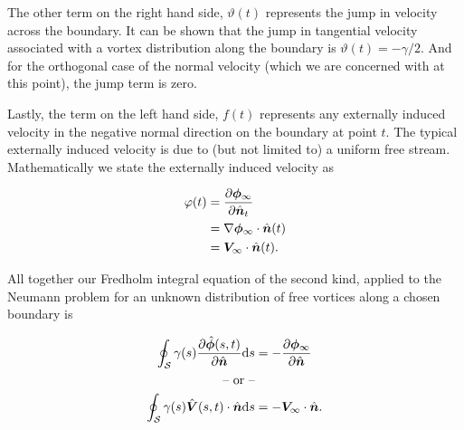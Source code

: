 The other term on the right hand side, \(\vartheta(t)\) represents the jump in velocity across the boundary.
%
It can be shown that the jump in tangential velocity associated with a vortex distribution along the boundary is \(\vartheta(t) = -\gamma/2\).
%
And for the orthogonal case of the normal velocity (which we are concerned with at this point), the jump term is zero.%
%

Lastly, the term on the left hand side, \(f(t)\) represents any externally induced velocity in the negative normal direction on the boundary at point \(t\).
%
The typical externally induced velocity is due to (but not limited to) a uniform free stream.
%
Mathematically we state the externally induced velocity as

\begin{equation}
    \begin{aligned}
    \varphi(t) &= \frac{\partial \bm{\phi}_\infty}{\partial \hat{\bm{n}}_t} \\
               &= \nabla \bm{\phi}_\infty \cdot \hat{\bm{n}}(t) \\
               &= \bm{V}_\infty \cdot \hat{\bm{n}}(t).
    \end{aligned}
\end{equation}

All together our Fredholm integral equation of the second kind, applied to the Neumann problem for an unknown distribution of free vortices along a chosen boundary is

\begin{subequations}
    \label{eqn:fredholm2}
    \begin{align}
        \oint_\mathcal{S} \gamma(s) \frac{\partial \hat{\bm{\phi}}(s,t)}{\partial \hat{\bm{n}}} \mathrm{d} s  &= -\frac{\partial \bm{\phi}_\infty}{\partial \hat{\bm{n}}} \\
        \text{-- or --} \notag\\
        \oint_\mathcal{S} \gamma(s) \hat{\bm{V}}(s,t)\cdot\hat{\bm{n}} \mathrm{d} s  &= -\bm{V}_\infty\cdot\hat{\bm{n}}.
    \end{align}
\end{subequations}


